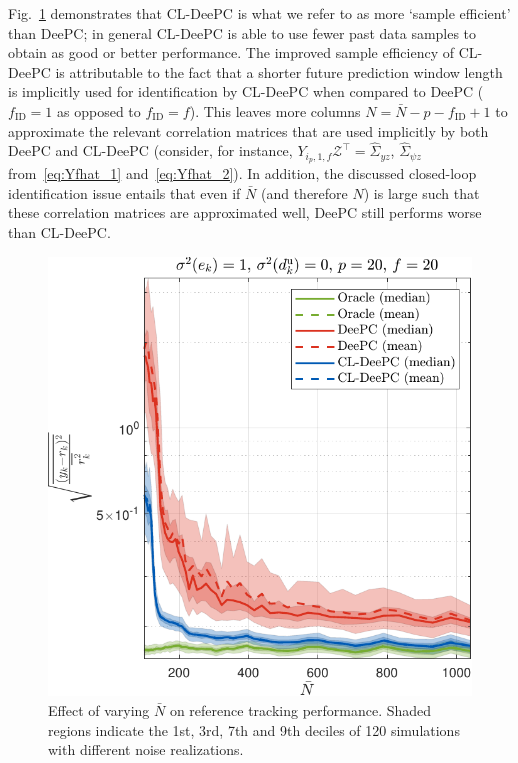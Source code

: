 Fig.~\ref{fig:varying_Nbar} demonstrates that \ac{CL-DeePC} is what we refer to as more `sample efficient' than \ac{DeePC}; in general \ac{CL-DeePC} is able to use fewer past data samples to obtain as good or better performance. The improved sample efficiency of \ac{CL-DeePC} is attributable to the fact that a shorter future prediction window length is implicitly used for identification by \ac{CL-DeePC} when compared to \ac{DeePC} ($f_\mathrm{ID}=1$ as opposed to $f_\mathrm{ID}=f$). This leaves more columns $N=\bar{N}-p-f_\mathrm{ID}+1$ to approximate the relevant correlation matrices that are used implicitly by both \ac{DeePC} and \ac{CL-DeePC} (consider, for instance, $Y_{i_p,1,f}\mathcal{Z}^\top=\hat{\Sigma}_{yz}$, $\hat{\Sigma}_{\psi z}$ from~\eqref{eq:Yfhat_1} and~\eqref{eq:Yfhat_2}). In addition, the discussed closed-loop identification issue entails that even if $\bar{N}$ (and therefore $N$) is large such that these correlation matrices are approximated well, \ac{DeePC} still performs worse than \ac{CL-DeePC}.
\begin{figure}[t!]
\begin{center}
\includegraphics[width=\columnwidth]{results/figures/Varying_Nbar_99-1039-50_p_20_f_20_Re_1_Ru_1_Rdu_0_Q_100_R_0_dR_10.pdf}    %
\caption{Effect of varying $\bar{N}$ on reference tracking performance. Shaded regions indicate the 1st, 3rd, 7th and 9th deciles of 120 simulations with different noise realizations.}  %
\label{fig:varying_Nbar}                                 %
\end{center}                                 %
\end{figure}

